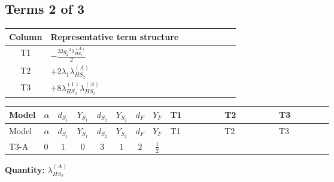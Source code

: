\documentclass[8pt]{article}
\begin{document}
\begin{landscape}
\subsection*{Terms 2 of 3}
\begin{center}
\begin{tabular}{@{}c >{\raggedright\arraybackslash}p{0.82\linewidth}@{}}
\toprule
Column & Representative term structure \\
\midrule
T1 & \(\displaystyle -\frac{33 {g_2}^2 {\lambda_{HS_2}^{(A)}}}{2}\) \\
\midrule
T2 & \(\displaystyle +2 {\lambda_1} {\lambda_{HS_2}^{(A)}}\) \\
\midrule
T3 & \(\displaystyle +8 {\lambda_{HS_2}^{(1)}} {\lambda_{HS_2}^{(A)}}\) \\
\midrule
\bottomrule
\end{tabular}
\end{center}
\smallskip
\tiny
\begin{longtable}{@{}llcccccc >{\raggedright\arraybackslash}p{0.21\linewidth} >{\raggedright\arraybackslash}p{0.21\linewidth} >{\raggedright\arraybackslash}p{0.21\linewidth}@{}}
\toprule
Model & $\alpha$ & $d_{S_1}$ & $Y_{S_1}$ & $d_{S_2}$ & $Y_{S_2}$ & $d_F$ & $Y_F$ & T1 & T2 & T3 \\
\midrule
\endfirsthead
\toprule
Model & $\alpha$ & $d_{S_1}$ & $Y_{S_1}$ & $d_{S_2}$ & $Y_{S_2}$ & $d_F$ & $Y_F$ & T1 & T2 & T3 \\
\midrule
\endhead
T3-A & $0$ & $1$ & $0$ & $3$ & $1$ & $2$ & $\frac{1}{2}$ & \scriptsize\adjustbox{max width=\linewidth}{$\begin{gathered} -\frac{33 {g_2}^2 {\lambda_{HS_2}^{(A)}}}{2}\end{gathered}$} & \scriptsize\adjustbox{max width=\linewidth}{$\begin{gathered} +2 {\lambda_1} {\lambda_{HS_2}^{(A)}}\end{gathered}$} & \scriptsize\adjustbox{max width=\linewidth}{$\begin{gathered} +8 {\lambda_{HS_2}^{(1)}} {\lambda_{HS_2}^{(A)}}\end{gathered}$} \\
\midrule
\bottomrule
\end{longtable}
\clearpage
\noindent\textbf{Quantity: }$\lambda_{HS_2}^{(A)}$\par\smallskip

\end{landscape}
\end{document}
